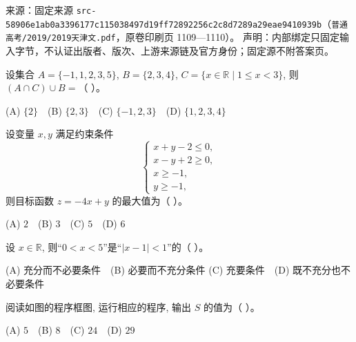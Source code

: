 
\begin{gktip}
来源：固定来源 \texttt{src-58906e1ab0a3396177c115038497d19ff72892256c2c8d7289a29eae9410939b}（\texttt{普通高考/2019/2019天津文.pdf}，原卷印刷页 1109—1110）。
声明：内部绑定只固定输入字节，不认证出版者、版次、上游来源链及官方身份；固定源不附答案页。
\end{gktip}

\par\medskip


\begin{question}
设集合 $A = \{-1, 1, 2, 3, 5\}$, $B = \{2, 3, 4\}$, $C = \{x \in \mathbb{R} \mid 1 \leqslant x < 3\}$, 则 $(A \cap C) \cup B =$（ ）。

(A) $\{2\}$　(B) $\{2, 3\}$　(C) $\{-1, 2, 3\}$　(D) $\{1, 2, 3, 4\}$

\end{question}
\begin{question}
设变量 $x, y$ 满足约束条件
\nopagebreak[4]
\[
\begin{cases}
x + y - 2 \leqslant 0, \\
x - y + 2 \geqslant 0, \\
x \geqslant -1, \\
y \geqslant -1,
\end{cases}
\]
则目标函数 $z = -4x + y$ 的最大值为（ ）。

(A) $2$　(B) $3$　(C) $5$　(D) $6$

\end{question}
\begin{question}
设 $x \in \mathbb{R}$, 则“$0 < x < 5$”是“$|x - 1| < 1$”的（ ）。

(A) 充分而不必要条件　(B) 必要而不充分条件  
(C) 充要条件　(D) 既不充分也不必要条件

\Needspace{0.4\textheight}
\end{question}
\begin{question}
阅读如图的程序框图, 运行相应的程序, 输出 $S$ 的值为（ ）。
\nopagebreak[4]
\begin{center}\end{center}
\nopagebreak[4]
(A) $5$　(B) $8$　(C) $24$　(D) $29$

\end{question}
